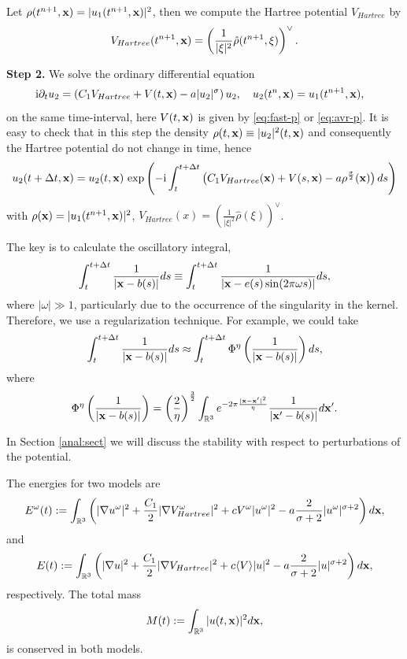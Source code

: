 \documentclass[10pt, leqno]{amsart}
\newcommand{\R}{\mathbb{R}}
\newcommand{\beq}{\begin{equation}}
\newcommand{\ee}{\end{equation}}
\newcommand{\I}{\mathrm{i}}
\newcommand{\btd}{\nabla}
\newcommand{\btu}{\Delta}
\newcommand{\og}{\omega}
\newcommand{\sg}{\sigma}
\newcommand{\dpm}{\displaystyle}
\newcommand{\df}{:=}
\newcommand{\xb}{\boldsymbol{\rm{x}}}
\def\({\left(}
\def\){\right)}
\begin{document}
Let $\rho(t^{n+1},\xb)=|u_1(t^{n+1},\xb)|^2$, then we compute the Hartree potential $V_{Hartree}$ by
\[V_{Hartree}(t^{n+1},\xb)=\(\frac{1}{|\xi|^2}\hat{\rho}(t^{n+1}, \xi)\)^\vee.\]

\textbf{Step 2.} We solve the ordinary differential equation
\begin{equation}
\label{ts2}
\begin{aligned}
& \,\I \partial _tu_2  = \left(C_1V_{Hartree}+V(t,\xb)-a|u_2|^\sg\right)u_2, \quad u_2(t^{n},\xb)=u_1(t^{n+1},\xb),
\end{aligned}
\end{equation}
on the same time-interval, here $V(t,\xb)$ is given by \eqref{eq:fast-p} or \eqref{eq:avr-p}.
It is easy to check that in this step the density $\rho(t,\xb)\equiv|u_2|^2(t,\xb)$ and consequently the Hartree potential do not change in time, hence
\[ u_2(t+\btu t,\xb)=u_2(t,\xb)\,\exp\({\dpm-\I \int_{t}^{t+\btu t}
\left(C_1V_{Hartree}(\xb)+V(s,\xb)-a\rho^\frac{\sg}{2}(\xb)\right) ds}\)
\] with $\rho(\xb)=|u_1(t^{n+1},\xb)|^2$, $V_{Hartree}(x)=\(\frac{1}{|\xi|^2}\hat{\rho}(\xi)\)^\vee$.

The key is to calculate the oscillatory integral,
\beq\int_{t}^{t+\btu t} \frac{1}{\left|\xb-b(s)\right|}ds\equiv \int_{t}^{t+\btu t} \frac{1}{\left|\xb-e(s)\sin(2\pi\og s)\right|}ds,\label{2.3}\ee
where $|\og|\gg1$, particularly due to the occurrence of the singularity in the kernel.
Therefore, we use a regularization technique. For example, we could take
\beq\int_{t}^{t+\btu t} \frac{1}{\left|\xb-b(s)\right|}ds\approx \int_{t}^{t+\btu t}\Phi^\eta \(\frac{1}{\left|\xb-b(s)\right|}\)ds,\label{2.4}\ee
where
\[\Phi^\eta \(\frac{1}{\left|\xb-b(s)\right|}\)=\(\frac{2}{\eta}\)^{\frac{3}{2}}
\int_{\R^3}e^{-2\pi\frac{|\xb-\xb'|^2}{\eta}}\frac{1}{\left|\xb'-b(s)\right|}d\xb'.\]


In Section \ref{anal:sect} we will discuss the stability with respect to perturbations of the potential.

The energies for two models are
\beq\label{eq:energy1}
E^\og(t)\df\int_{\R^3}\(|\btd u^\omega|^2+\frac{C_1}{2}|\btd V_{Hartree}^\omega|^2
+cV^\og|u^\omega|^2-a\frac{2}{\sg+2}|u^\omega|^{\sg+2}\)d\xb,
\ee
and
\beq\label{eq:energy2}
E(t)\df\int_{\R^3}\(|\btd u|^2+\frac{C_1}{2}|\btd V_{Hartree}|^2+{c}\langle V\rangle|u|^2-a\frac{2}{\sg+2}|u|^{\sg+2}\)d\xb,
\ee
respectively. The total mass
\beq\label{eq:mass}
M(t)\df\int_{\R^3}|u(t,\xb)|^2d\xb,
\ee
is conserved in both models.
\end{document}

